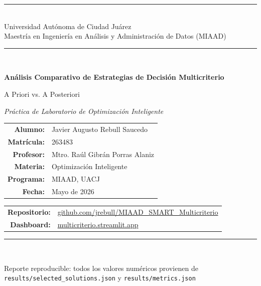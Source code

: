 \documentclass[11pt,letterpaper]{article}
\title{}
\date{}
\begin{document}
\begin{titlepage}
\thispagestyle{empty}
\centering
\vspace*{1.5cm}

{\color{uacjazul}\rule{\linewidth}{1.2pt}}\\[0.4cm]
{\color{uacjgris}\large Universidad Autónoma de Ciudad Juárez}\\[0.2cm]
{\color{uacjgris}\large Maestría en Ingeniería en Análisis y Administración de Datos (MIAAD)}\\[0.5cm]
{\color{uacjazul}\rule{\linewidth}{1.2pt}}\\[2.0cm]

{\Huge\bfseries\color{uacjazul} Análisis Comparativo de Estrategias de Decisión Multicriterio\par}
\vspace{0.4cm}
{\LARGE\color{uacjazul} A Priori vs. A Posteriori\par}
\vspace{0.8cm}
{\large\itshape Práctica de Laboratorio de Optimización Inteligente\par}

\vspace{2.5cm}

\begin{tabular}{rl}
\textbf{Alumno:} & Javier Augusto Rebull Saucedo \\
\textbf{Matrícula:} & 263483 \\
\textbf{Profesor:} & Mtro. Raúl Gibrán Porras Alaniz \\
\textbf{Materia:} & Optimización Inteligente \\
\textbf{Programa:} & MIAAD, UACJ \\
\textbf{Fecha:} & Mayo de 2026 \\
\end{tabular}

\vspace{1.2cm}

\begin{tabular}{rl}
\textbf{Repositorio:} & \href{https://github.com/jrebull/MIAAD_SMART_Multicriterio}{github.com/jrebull/MIAAD\_SMART\_Multicriterio} \\
\textbf{Dashboard:} & \href{https://multicriterio.streamlit.app}{multicriterio.streamlit.app} \\
\end{tabular}

\vfill
{\color{uacjoro}\rule{\linewidth}{2pt}}\\[0.3cm]
{\small\color{uacjgris} Reporte reproducible: todos los valores numéricos provienen de
\texttt{results/selected\_solutions.json} y \texttt{results/metrics.json}\par}
\end{titlepage}
\setcounter{page}{2}
\end{document}
